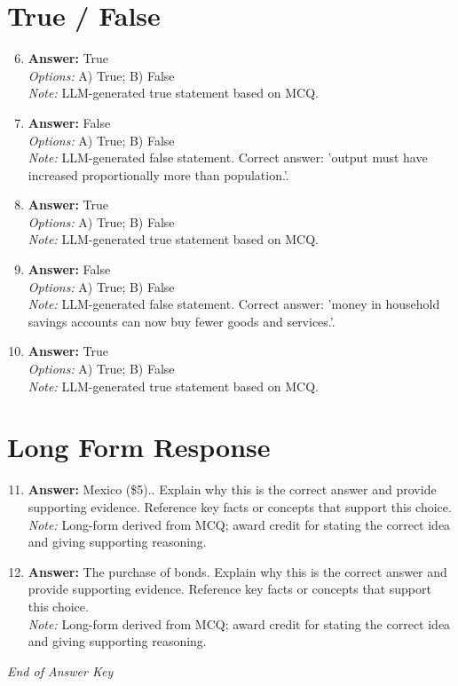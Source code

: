 \documentclass[12pt]{article}
\begin{document}
\section*{True / False}
\begin{enumerate}[label=\arabic*.]
\setcounter{enumi}{5}
\item \textbf{Answer:} True
\\ \textit{Options:} A) True; B) False
\\ \textit{Note:} LLM-generated true statement based on MCQ.
\item \textbf{Answer:} False
\\ \textit{Options:} A) True; B) False
\\ \textit{Note:} LLM-generated false statement. Correct answer: 'output must have increased proportionally more than population.'.
\item \textbf{Answer:} True
\\ \textit{Options:} A) True; B) False
\\ \textit{Note:} LLM-generated true statement based on MCQ.
\item \textbf{Answer:} False
\\ \textit{Options:} A) True; B) False
\\ \textit{Note:} LLM-generated false statement. Correct answer: 'money in household savings accounts can now buy fewer goods and services.'.
\item \textbf{Answer:} True
\\ \textit{Options:} A) True; B) False
\\ \textit{Note:} LLM-generated true statement based on MCQ.
\end{enumerate}

\section*{Long Form Response}
\begin{enumerate}[label=\arabic*.]
\setcounter{enumi}{10}
\item \textbf{Answer:} Mexico (\$5).. Explain why this is the correct answer and provide supporting evidence. Reference key facts or concepts that support this choice.
\\ \textit{Note:} Long-form derived from MCQ; award credit for stating the correct idea and giving supporting reasoning.
\item \textbf{Answer:} The purchase of bonds. Explain why this is the correct answer and provide supporting evidence. Reference key facts or concepts that support this choice.
\\ \textit{Note:} Long-form derived from MCQ; award credit for stating the correct idea and giving supporting reasoning.
\end{enumerate}

\vfill
\noindent\textit{End of Answer Key}
\end{document}
